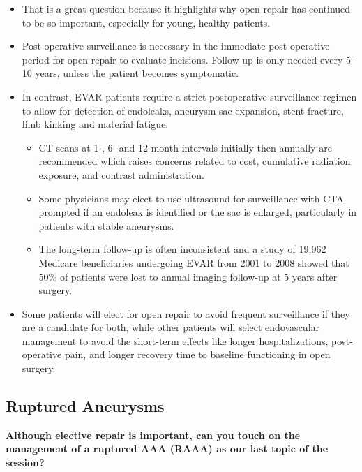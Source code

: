 \documentclass[
]{book}
\begin{document}
\begin{itemize}
\item
  That is a great question because it highlights why open repair has
  continued to be so important, especially for young, healthy
  patients.
\item
  Post-operative surveillance is necessary in the immediate
  post-operative period for open repair to evaluate incisions.
  Follow-up is only needed every 5-10 years, unless the patient
  becomes symptomatic.
\item
  In contrast, EVAR patients require a strict postoperative
  surveillance regimen to allow for detection of endoleaks, aneurysm
  sac expansion, stent fracture, limb kinking and material fatigue.

  \begin{itemize}
  \item
    CT scans at 1-, 6- and 12-month intervals initially then
    annually are recommended which raises concerns related to cost,
    cumulative radiation exposure, and contrast administration.
  \item
    Some physicians may elect to use ultrasound for surveillance
    with CTA prompted if an endoleak is identified or the sac is
    enlarged, particularly in patients with stable aneurysms.
  \item
    The long-term follow-up is often inconsistent and a study of
    19,962 Medicare beneficiaries undergoing EVAR from 2001 to 2008
    showed that 50\% of patients were lost to annual imaging
    follow-up at 5 years after
    surgery.\citep{schanzerFollowUpComplianceEndovascular2015}
  \end{itemize}
\item
  Some patients will elect for open repair to avoid frequent
  surveillance if they are a candidate for both, while other patients
  will select endovascular management to avoid the short-term effects
  like longer hospitalizations, post-operative pain, and longer
  recovery time to baseline functioning in open surgery.
\end{itemize}

\hypertarget{ruptured-aneurysms}{%
\subsection{Ruptured Aneurysms}\label{ruptured-aneurysms}}

\textbf{Although elective repair is important, can you touch on the management
of a ruptured AAA (RAAA) as our last topic of the session?}
\citep{mooreVascularEndovascularSurgery2019, lindsayChapter74Ruptured2019}
\end{document}
